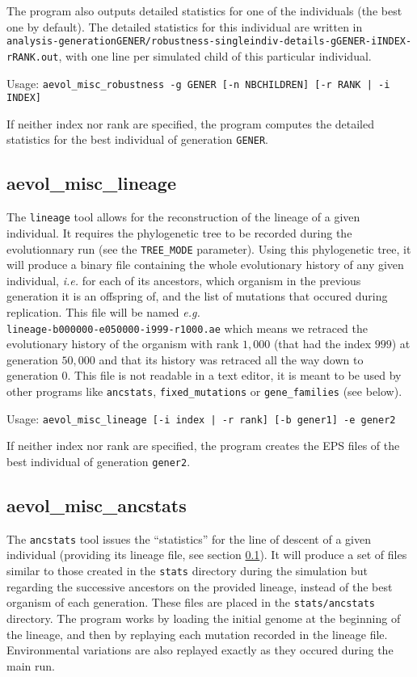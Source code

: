 The program also outputs detailed statistics for one of the individuals (the best one by default). The detailed statistics for this individual are written in\\ \verb?analysis-generationGENER/robustness-singleindiv-details-gGENER-iINDEX-rRANK.out?, with one line per simulated child of this particular individual.

Usage: \verb?aevol_misc_robustness -g GENER [-n NBCHILDREN] [-r RANK | -i INDEX]?

If neither index nor rank are specified, the program computes the detailed statistics for the best individual of generation \verb?GENER?.


\subsection{aevol\_misc\_lineage}
\label{sect:lineage}
The \verb?lineage? tool allows for the reconstruction of the lineage of a given individual. It requires the phylogenetic tree to be recorded during the evolutionnary run (see the \verb?TREE_MODE? parameter). Using this phylogenetic tree, it will produce a binary file containing the whole evolutionary history of any given individual, \emph{i.e.} for each of its ancestors, which organism in the previous generation it is an offspring of, and the list of mutations that occured during replication. This file will be named \emph{e.g.} \\\verb?lineage-b000000-e050000-i999-r1000.ae? which means we retraced the evolutionary history of the organism with rank $1,000$ (that had the index $999$) at generation $50,000$ and that its history was retraced all the way down to generation $0$. This file is not readable in a text editor, it is meant to be used by other programs like \verb?ancstats?, \verb?fixed_mutations? or \verb?gene_families? (see below).

Usage: \verb?aevol_misc_lineage [-i index | -r rank] [-b gener1] -e gener2?

If neither index nor rank are specified, the program creates the EPS files of the best individual of generation \verb?gener2?.


\subsection{aevol\_misc\_ancstats}
\label{sect:ancstats}
The \verb?ancstats? tool issues the ``statistics'' for the line of descent of a given individual (providing its lineage file, see section \ref{sect:lineage}). It will produce a set of files similar to those created in the \verb?stats? directory during the simulation but regarding the successive ancestors on the provided lineage, instead of the best organism of each generation. These files are placed in the \verb?stats/ancstats? directory. The program works by loading the initial genome at the beginning of the lineage, and then by replaying each mutation recorded in the lineage file. Environmental variations are also replayed exactly as they occured during the main run.

